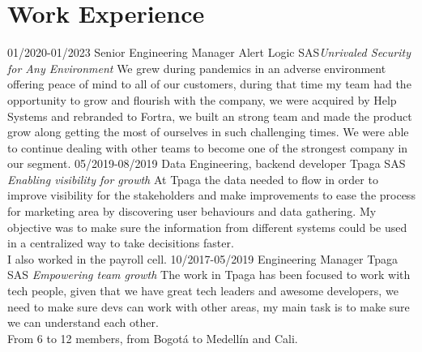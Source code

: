\section{Work Experience}

\begin{entrylist}
  \entry
    {01/2020-01/2023}
    {Senior Engineering Manager}
    {Alert Logic SAS{\sl Unrivaled Security for Any Environment}}
    {We grew during pandemics in an adverse environment offering
    peace of mind to all of our customers, during that time my team
    had the opportunity to grow and flourish with the company, we
    were acquired by Help Systems and rebranded to Fortra, we built
    an strong team and made the product grow along getting the
    most of ourselves in such challenging times.  We were able
    to continue dealing with other teams to become one of the
    strongest company in our segment.}
  \entry
    {05/2019-08/2019}
    {Data Engineering, backend developer}
    {Tpaga SAS {\sl Enabling visibility for growth}}
    {At Tpaga the data needed to flow in order to improve visibility for the
    stakeholders and make improvements to ease the process for marketing area
    by discovering user behaviours and data gathering.  My objective was to
    make sure the information from different systems could be used in a centralized
    way to take decisitions faster.\\I also worked in the payroll cell.}
  \entry
    {10/2017-05/2019}
    {Engineering Manager}
    {Tpaga SAS {\sl Empowering team growth}}
    {The work in Tpaga has been focused to work with tech people, given
    that we have great tech leaders and awesome developers, we need to
    make sure devs can work with other areas, my main task is to make
    sure we can understand each other.\\From 6 to 12 members, from Bogotá to Medellín and Cali. }

  \end{entrylist}
  
  \newpage
  

